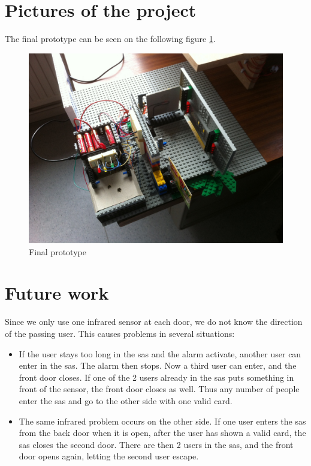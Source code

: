 
\section{Pictures of the project}
The final prototype can be seen on the following figure \ref{finalPrototype}.
\begin{figure}[!h]
	\includegraphics[scale=0.18]{photo1}
    \caption{Final prototype}
    \label{finalPrototype}
\end{figure}

\section{Future work}
Since we only use one infrared sensor at each door, we do not know the direction of the passing user. This causes problems in several situations:

\begin{itemize}
	\item If the user stays too long in the sas and the alarm activate, another user can enter in the sas. The alarm then stops. Now a third user can enter, and the front door closes. If one of the 2 users already in the sas puts something in front of the sensor, the front door closes as well. Thus any number of people enter the sas and go to the other side with one valid card.
    
    \item The same infrared problem occurs on the other side. If one user enters the sas from the back door when it is open, after the user has shown a valid card, the sas closes the second door. There are then 2 users in the sas, and the front door opens again, letting the second user escape.
	
\end{itemize}

